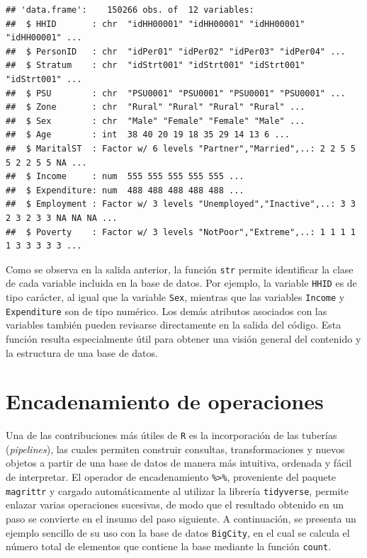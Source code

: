 \documentclass[
  spanish,
  12pt,
]{book}
\begin{document}
\begin{verbatim}
## 'data.frame':    150266 obs. of  12 variables:
##  $ HHID       : chr  "idHH00001" "idHH00001" "idHH00001" "idHH00001" ...
##  $ PersonID   : chr  "idPer01" "idPer02" "idPer03" "idPer04" ...
##  $ Stratum    : chr  "idStrt001" "idStrt001" "idStrt001" "idStrt001" ...
##  $ PSU        : chr  "PSU0001" "PSU0001" "PSU0001" "PSU0001" ...
##  $ Zone       : chr  "Rural" "Rural" "Rural" "Rural" ...
##  $ Sex        : chr  "Male" "Female" "Female" "Male" ...
##  $ Age        : int  38 40 20 19 18 35 29 14 13 6 ...
##  $ MaritalST  : Factor w/ 6 levels "Partner","Married",..: 2 2 5 5 5 2 2 5 5 NA ...
##  $ Income     : num  555 555 555 555 555 ...
##  $ Expenditure: num  488 488 488 488 488 ...
##  $ Employment : Factor w/ 3 levels "Unemployed","Inactive",..: 3 3 2 3 2 3 3 NA NA NA ...
##  $ Poverty    : Factor w/ 3 levels "NotPoor","Extreme",..: 1 1 1 1 1 3 3 3 3 3 ...
\end{verbatim}

Como se observa en la salida anterior, la función \texttt{str} permite identificar la clase de cada variable incluida en la base de datos. Por ejemplo, la variable \texttt{HHID} es de tipo carácter, al igual que la variable \texttt{Sex}, mientras que las variables \texttt{Income} y \texttt{Expenditure} son de tipo numérico. Los demás atributos asociados con las variables también pueden revisarse directamente en la salida del código. Esta función resulta especialmente útil para obtener una visión general del contenido y la estructura de una base de datos.

\section{Encadenamiento de operaciones}\label{encadenamiento-de-operaciones}

Una de las contribuciones más útiles de \texttt{R} es la incorporación de las tuberías (\emph{pipelines}), las cuales permiten construir consultas, transformaciones y nuevos objetos a partir de una base de datos de manera más intuitiva, ordenada y fácil de interpretar. El operador de encadenamiento \texttt{\%\textgreater{}\%}, proveniente del paquete \texttt{magrittr} \citep{pipe} y cargado automáticamente al utilizar la librería \texttt{tidyverse}, permite enlazar varias operaciones sucesivas, de modo que el resultado obtenido en un paso se convierte en el insumo del paso siguiente. A continuación, se presenta un ejemplo sencillo de su uso con la base de datos \texttt{BigCity}, en el cual se calcula el número total de elementos que contiene la base mediante la función \texttt{count}.
\end{document}
